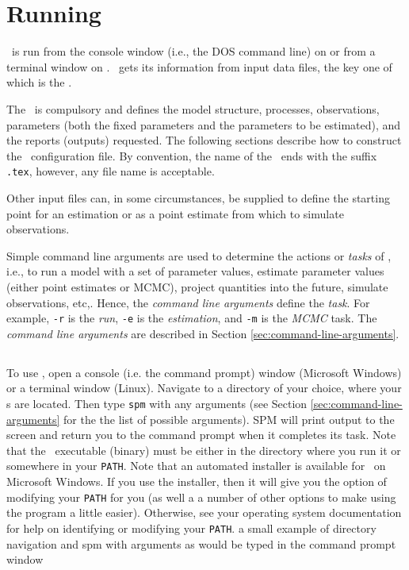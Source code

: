 \section{Running \SAM\label{sec:running-sam}}
\CH
\SAM\ is run from the console window (i.e., the DOS command line) on  or from a terminal window on . \SAM\ gets its information from input data files, the key one of which is the \config{}. 

The \config\ is compulsory and defines the model structure, processes, observations, parameters (both the fixed parameters and the parameters to be estimated), and the reports (outputs) requested. The following sections  describe how to construct the \SAM\ configuration file. By convention, the name of the \config\ ends with the suffix \texttt{.tex}, however, any file name is acceptable.

Other input files can, in some circumstances, be supplied to define the starting point for an estimation %
or as a point estimate from which to simulate observations.

Simple command line arguments are used to determine the actions or \emph{tasks} of \SAM, i.e., to run a model with a set of parameter values, estimate parameter values (either point estimates or MCMC), project quantities into the future, simulate observations, etc,. Hence, the \emph{command line arguments} define the \emph{task}. For example, \texttt{-r} is the \emph{run}, \texttt{-e} is the \emph{estimation}, and \texttt{-m} is the \emph{MCMC} task. The \emph{command line arguments} are described in Section \ref{sec:command-line-arguments}.

\subsection{}
\CH
To use \SAM, open a console (i.e. the command prompt) window (Microsoft Windows) or a terminal window (Linux). Navigate to a directory of your choice, where your \config s are located. Then type \texttt{spm} with any arguments (see Section \ref{sec:command-line-arguments} for the the list of possible arguments). SPM will print output to the screen and return you to the command prompt when it completes its task. Note that the \SAM\ executable (binary) must be either in the directory where you run it or somewhere in your \texttt{PATH}. Note that an automated installer is available for \SAM\ on Microsoft Windows. If you use the installer, then it will give you the option of modifying your \texttt{PATH} for you (as well a a number of other options to make using the program a little easier). Otherwise, see your operating system documentation for help on identifying or modifying your \texttt{PATH}.
\EX a small example of directory navigation and spm with arguments as would be typed in the command prompt window  \EXend

